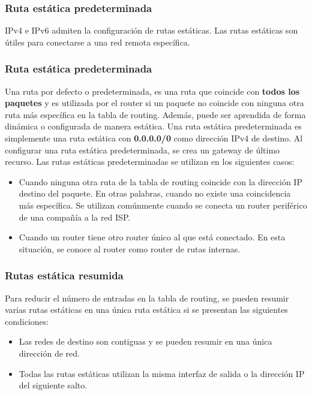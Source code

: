 \documentclass[
	12pt, %
	fleqn, %
	a4paper, %
	oneside, %
]{LegrandOrangeBook}
\begin{document}
\subsubsection*{Ruta estática predeterminada}
IPv4 e IPv6 admiten la configuración de rutas estáticas. Las rutas estáticas son útiles para conectarse a una red remota específica.
\subsubsection*{Ruta estática predeterminada}
Una ruta por defecto o predeterminada, es una ruta que coincide con \textbf{todos los paquetes} y es utilizada por el router si un paquete no coincide con ninguna otra ruta más específica en la tabla de routing. Además, puede ser aprendida de forma dinámica o configurada de manera estática. Una ruta estática predeterminada es simplemente una ruta estática con \textbf{0.0.0.0/0} como dirección IPv4 de destino. Al configurar una ruta estática predeterminada, se crea un gateway de último recurso. Las rutas estáticas predeterminadas se utilizan en los siguientes casos:
\begin{itemize}
\item Cuando ninguna otra ruta de la tabla de routing coincide con la dirección IP destino del paquete. En otras palabras, cuando no existe una coincidencia más específica. Se utilizan comúnmente cuando se conecta un router periférico de una compañía a la red ISP.
\item Cuando un router tiene otro router único al que está conectado. En esta situación, se conoce al router como router de rutas internas.
\end{itemize}
\subsubsection*{Rutas estática resumida}
Para reducir el número de entradas en la tabla de routing, se pueden resumir varias rutas estáticas en una única ruta estática si se presentan las siguientes condiciones:
\begin{itemize}
\item Las redes de destino son contiguas y se pueden resumir en una única dirección de red.
\item Todas las rutas estáticas utilizan la misma interfaz de salida o la dirección IP del siguiente salto.
\end{itemize}
\end{document}
